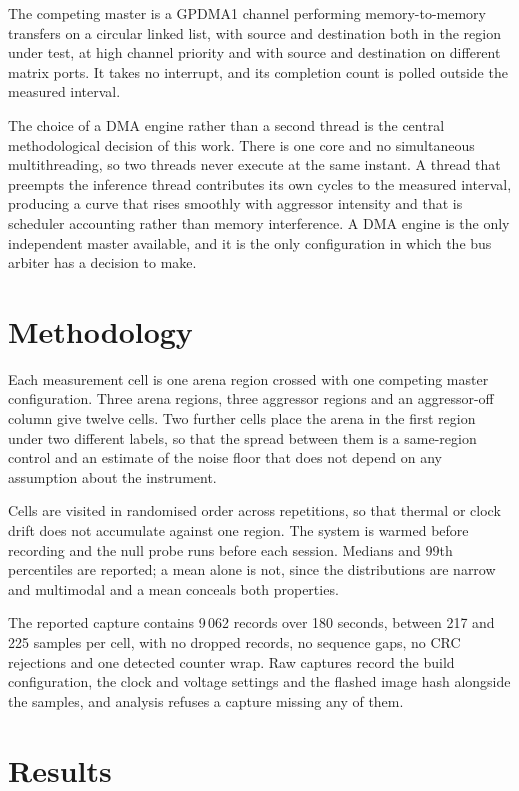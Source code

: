 \documentclass[conference]{IEEEtran}
\begin{document}
The competing master is a GPDMA1 channel performing memory-to-memory
transfers on a circular linked list, with source and destination both in
the region under test, at high channel priority and with source and
destination on different matrix ports. It takes no interrupt, and its
completion count is polled outside the measured interval.

The choice of a DMA engine rather than a second thread is the central
methodological decision of this work. There is one core and no
simultaneous multithreading, so two threads never execute at the same
instant. A thread that preempts the inference thread contributes its own
cycles to the measured interval, producing a curve that rises smoothly
with aggressor intensity and that is scheduler accounting rather than
memory interference. A DMA engine is the only independent master
available, and it is the only configuration in which the bus arbiter has
a decision to make.

\section{Methodology}

Each measurement cell is one arena region crossed with one competing
master configuration. Three arena regions, three aggressor regions and an
aggressor-off column give twelve cells. Two further cells place the arena
in the first region under two different labels, so that the spread
between them is a same-region control and an estimate of the noise floor
that does not depend on any assumption about the instrument.

Cells are visited in randomised order across repetitions, so that thermal
or clock drift does not accumulate against one region. The system is
warmed before recording and the null probe runs before each session.
Medians and 99th percentiles are reported; a mean alone is not, since the
distributions are narrow and multimodal and a mean conceals both
properties.

The reported capture contains 9\,062 records over 180 seconds, between
217 and 225 samples per cell, with no dropped records, no sequence gaps,
no CRC rejections and one detected counter wrap. Raw captures record the
build configuration, the clock and voltage settings and the flashed image
hash alongside the samples, and analysis refuses a capture missing any of
them.

\section{Results}
\end{document}
